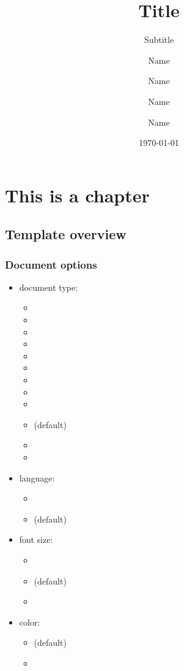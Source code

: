 \documentclass[report,english]{enacom}
\title{Title}
\subtitle{Subtitle}
\author[~][degree]{Name}{Surname}
\author{Name}{Surname}
\author{Name}{Surname}
\author{Name}{Surname}
\date{\today}
\begin{document}
\chapter{This is a chapter}


\section{Template overview}


\subsection{Document options}
	\begin{itemize}
		\item document type:
			\begin{itemize}
				\item {}
				\item {}
				\item {}
				\item {}
				\item {}
				\item {}
				\item {}
				\item {}
				\item {}
				\item {} (default)
				\item {}
				\item {}
			\end{itemize}
	\end{itemize}
	\begin{itemize}
		\item language:
			\begin{itemize}
				\item {}
				\item {} (default)
			\end{itemize}
		\item font size:
			\begin{itemize}
				\item \code{10pt}
				\item \code{11pt} (default)
				\item \code{12pt}
			\end{itemize}
		\item color:
			\begin{itemize}
				\item {} (default)
				\item {}
			\end{itemize}
	\end{itemize}
\end{document}
